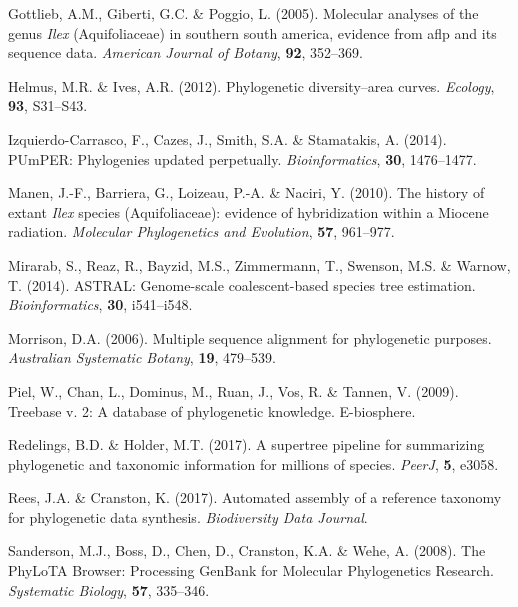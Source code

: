 \documentclass[]{article}
\begin{document}
\leavevmode\hypertarget{ref-gottlieb2005molecular}{}%
Gottlieb, A.M., Giberti, G.C. \& Poggio, L. (2005). Molecular analyses of the genus \emph{Ilex} (Aquifoliaceae) in southern south america, evidence from aflp and its sequence data. \emph{American Journal of Botany}, \textbf{92}, 352--369.

\leavevmode\hypertarget{ref-helmus2012phylogenetic}{}%
Helmus, M.R. \& Ives, A.R. (2012). Phylogenetic diversity--area curves. \emph{Ecology}, \textbf{93}, S31--S43.

\leavevmode\hypertarget{ref-izquierdo2014pumper}{}%
Izquierdo-Carrasco, F., Cazes, J., Smith, S.A. \& Stamatakis, A. (2014). PUmPER: Phylogenies updated perpetually. \emph{Bioinformatics}, \textbf{30}, 1476--1477.

\leavevmode\hypertarget{ref-manen2010history}{}%
Manen, J.-F., Barriera, G., Loizeau, P.-A. \& Naciri, Y. (2010). The history of extant \emph{Ilex} species (Aquifoliaceae): evidence of hybridization within a Miocene radiation. \emph{Molecular Phylogenetics and Evolution}, \textbf{57}, 961--977.

\leavevmode\hypertarget{ref-mirarab2014astral}{}%
Mirarab, S., Reaz, R., Bayzid, M.S., Zimmermann, T., Swenson, M.S. \& Warnow, T. (2014). ASTRAL: Genome-scale coalescent-based species tree estimation. \emph{Bioinformatics}, \textbf{30}, i541--i548.

\leavevmode\hypertarget{ref-morrison2006multiple}{}%
Morrison, D.A. (2006). Multiple sequence alignment for phylogenetic purposes. \emph{Australian Systematic Botany}, \textbf{19}, 479--539.

\leavevmode\hypertarget{ref-piel2009treebase}{}%
Piel, W., Chan, L., Dominus, M., Ruan, J., Vos, R. \& Tannen, V. (2009). Treebase v. 2: A database of phylogenetic knowledge. E-biosphere.

\leavevmode\hypertarget{ref-redelings2017supertree}{}%
Redelings, B.D. \& Holder, M.T. (2017). A supertree pipeline for summarizing phylogenetic and taxonomic information for millions of species. \emph{PeerJ}, \textbf{5}, e3058.

\leavevmode\hypertarget{ref-rees2017automated}{}%
Rees, J.A. \& Cranston, K. (2017). Automated assembly of a reference taxonomy for phylogenetic data synthesis. \emph{Biodiversity Data Journal}.

\leavevmode\hypertarget{ref-sanderson2008phylota}{}%
Sanderson, M.J., Boss, D., Chen, D., Cranston, K.A. \& Wehe, A. (2008). The PhyLoTA Browser: Processing GenBank for Molecular Phylogenetics Research. \emph{Systematic Biology}, \textbf{57}, 335--346.
\end{document}
